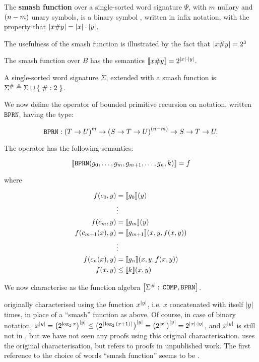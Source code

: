 \begin{definition} The \textbf{smash function} over a single-sorted word
signature $\Psi$, with $m$ nullary and $\p{n-m}$ unary symbols, is a binary
symbol \smashf{}, written in infix notation, with the property that $\card{x
\smashf{} y} = {\card{x}\cdot\card{y}}$.\end{definition}

The usefulness of the smash function is illustrated by the fact that $\card{x
\smashf{} y} = 2^3$

\begin{example} The smash function over $B$ has the semantics $\sem{x \smashf{}
y} = 2^{\card{x} \cdot \card{y}}$. \end{example}

\begin{definition} A single-sorted word signature $\Sigma$, extended with a
smash function is $\Sigma^\smashf{} \triangleq \Sigma \cup \set { \smashf{} : 2
}$. \end{definition}

We now define the operator of bounded primitive recursion on notation, written
$\mathtt{BPRN}$, having the type:

$$\mathtt{BPRN} : \p{T \rightarrow U}^m \rightarrow \p{S \rightarrow T
\rightarrow U}^\p{n-m} \rightarrow S \rightarrow T \rightarrow U.$$

The operator has the following semantics:

$$\sem{\mathtt{BPRN}\p{g_0, \ldots, g_m, g_{m+1}, \ldots, g_n, k}} = f$$

where

\begin{align*}
f\p{c_0,y} &= \sem{g_0}\p{y} \\
          & \vdots \\
f\p{c_m,y} &= \sem{g_m}\p{y} \\
f\p{c_{m+1}\p{x},y} &= \sem{g_{m+1}}\p{x,y,f\p{x,y}} \\
          & \vdots \\
f\p{c_n\p{x},y} &= \sem{g_n}\p{x,y,f\p{x,y}} \\
f\p{x,y} &\leq \sem{k}\p{x,y}
\end{align*}

We now characterise \FPTIME{} as the function algebra
$\algebra{\Sigma^\smashf{}}{\mathtt{COMP}, \mathtt{BPRN}}$.

\begin{remark} \cite{cobham-1965} originally characterised \FPTIME{} using the
function $x^\card{y}$, i.e. $x$ concatenated with itself $\card{y}$ times, in
place of a ``smash'' function as above. Of course, in case of binary notation,
$x^\card{y} = \p{2^{\log_2{x}}}^\card{y} \leq \p{2^{\ceil{\log_2\p{x+1}}}}^\card{y}
= \p{2^\card{x}}^\card{y} = 2^{\card{x} \cdot \card{y}}$, and $x^\card{y}$ is
still not in \FPTIME{}, but we have not seen any proofs using this original
characterisation. \cite{cook-1975} uses the original characterisation, but
refers to proofs in unpublished work.  The first reference to the choice of
words ``smash function'' seems to be \cite{buss-phd-1985-6}.  \end{remark}

